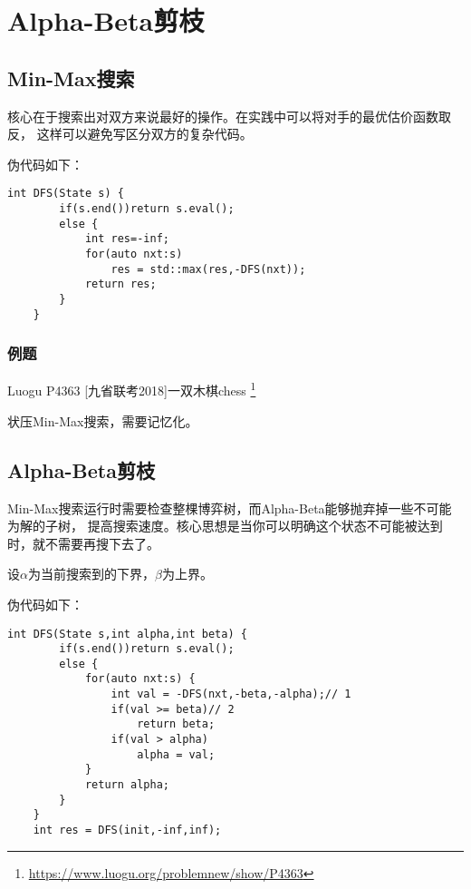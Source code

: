 \section{Alpha-Beta剪枝}
\subsection{Min-Max搜索}

核心在于搜索出对双方来说最好的操作。在实践中可以将对手的最优估价函数取反，
这样可以避免写区分双方的复杂代码。

伪代码如下：
\begin{lstlisting}[title=Min-Max Search]
    int DFS(State s) {
        if(s.end())return s.eval();
        else {
            int res=-inf;
            for(auto nxt:s)
                res = std::max(res,-DFS(nxt));
            return res;
        }
    }
\end{lstlisting}

\subsubsection{例题}
Luogu P4363 [九省联考2018]一双木棋chess
\footnote{\url{https://www.luogu.org/problemnew/show/P4363}}

状压Min-Max搜索，需要记忆化。



\subsection{Alpha-Beta剪枝}


Min-Max搜索运行时需要检查整棵博弈树，而Alpha-Beta能够抛弃掉一些不可能为解的子树，
提高搜索速度。核心思想是当你可以明确这个状态不可能被达到时，就不需要再搜下去了。

设$\alpha$为当前搜索到的下界，$\beta$为上界。

伪代码如下：
\begin{lstlisting}[title=Alpha-Beta 剪枝]
    int DFS(State s,int alpha,int beta) {
        if(s.end())return s.eval();
        else {
            for(auto nxt:s) {
                int val = -DFS(nxt,-beta,-alpha);// 1
                if(val >= beta)// 2
                    return beta;
                if(val > alpha)
                    alpha = val;
            }
            return alpha;
        }
    }
    int res = DFS(init,-inf,inf);
\end{lstlisting}

